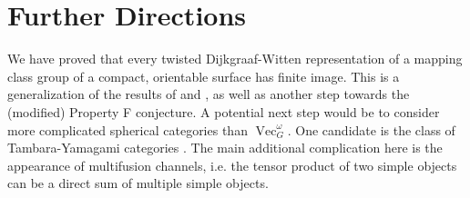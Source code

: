 \documentclass{amsart}
\DeclareMathOperator{\Vect}{Vec}
\newcommand{\vgo}{\Vect_G^\omega}
\begin{document}


\section{Further Directions}
We have proved that every twisted Dijkgraaf-Witten representation of a mapping class group of a compact, orientable surface has finite image.  This is a generalization of the results of \cite{erw} and \cite{fjfu}, as well as another step towards the (modified) Property F conjecture. A potential next step would be to consider more complicated spherical categories than $\vgo$.  One candidate is the class of Tambara-Yamagami categories \cite{tambara}.  The main additional complication here is the appearance of multifusion channels, i.e. the tensor product of two simple objects can be a direct sum of multiple simple objects.  
\end{document}
